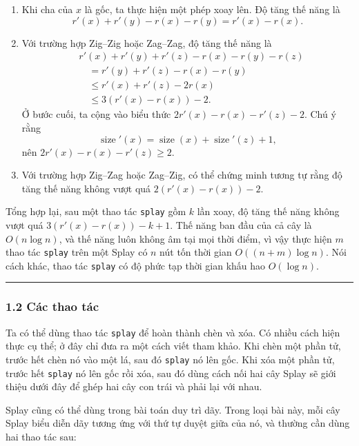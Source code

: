 \documentclass[11pt]{article}
\newcommand{\qedmark}{\hfill\rule{0.7ex}{0.7ex}}
\begin{document}
\begin{enumerate}
  \item Khi cha của \(x\) là gốc, ta thực hiện một phép xoay lên. Độ tăng thế
  năng là
  \[
    r'(x)+r'(y)-r(x)-r(y)=r'(x)-r(x).
  \]

  \item Với trường hợp Zig--Zig hoặc Zag--Zag, độ tăng thế năng là
  \[
  \begin{aligned}
    &r'(x)+r'(y)+r'(z)-r(x)-r(y)-r(z)\\
    &\quad = r'(y)+r'(z)-r(x)-r(y)\\
    &\quad \le r'(x)+r'(z)-2r(x)\\
    &\quad \le 3(r'(x)-r(x))-2.
  \end{aligned}
  \]
  Ở bước cuối, ta cộng vào biểu thức \(2r'(x)-r(x)-r'(z)-2\). Chú ý rằng
  \[
    \operatorname{size}'(x)=\operatorname{size}(x)+\operatorname{size}'(z)+1,
  \]
  nên \(2r'(x)-r(x)-r'(z)\ge 2\).

  \item Với trường hợp Zig--Zag hoặc Zag--Zig, có thể chứng minh tương tự rằng
  độ tăng thế năng không vượt quá \(2(r'(x)-r(x))-2\).
\end{enumerate}

Tổng hợp lại, sau một thao tác \texttt{splay} gồm \(k\) lần xoay, độ tăng thế
năng không vượt quá \(3(r'(x)-r(x))-k+1\). Thế năng ban đầu của cả cây là
\(O(n\log n)\), và thế năng luôn không âm tại mọi thời điểm, vì vậy thực hiện
\(m\) thao tác \texttt{splay} trên một Splay có \(n\) nút tốn thời gian
\(O((n+m)\log n)\). Nói cách khác, thao tác \texttt{splay} có độ phức tạp thời
gian khấu hao \(O(\log n)\). \qedmark

\subsubsection*{1.2 Các thao tác}

Ta có thể dùng thao tác \texttt{splay} để hoàn thành chèn và xóa. Có nhiều cách
hiện thực cụ thể; ở đây chỉ đưa ra một cách viết tham khảo. Khi chèn một phần
tử, trước hết chèn nó vào một lá, sau đó \texttt{splay} nó lên gốc. Khi xóa một
phần tử, trước hết \texttt{splay} nó lên gốc rồi xóa, sau đó dùng cách nối hai
cây Splay sẽ giới thiệu dưới đây để ghép hai cây con trái và phải lại với nhau.

Splay cũng có thể dùng trong bài toán duy trì dãy. Trong loại bài này, mỗi cây
Splay biểu diễn dãy tương ứng với thứ tự duyệt giữa của nó, và thường cần dùng
hai thao tác sau:
\end{document}
